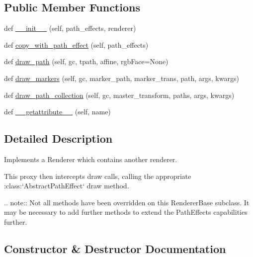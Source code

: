 \subsection*{Public Member Functions}
\begin{DoxyCompactItemize}
\item 
def \hyperlink{classmatplotlib_1_1patheffects_1_1PathEffectRenderer_ab66e2ac17ed5c48f7b41ad76886257ec}{\+\_\+\+\_\+init\+\_\+\+\_\+} (self, path\+\_\+effects, renderer)
\item 
def \hyperlink{classmatplotlib_1_1patheffects_1_1PathEffectRenderer_a7d03abb1e00bec7e2fd2e77923aa39fc}{copy\+\_\+with\+\_\+path\+\_\+effect} (self, path\+\_\+effects)
\item 
def \hyperlink{classmatplotlib_1_1patheffects_1_1PathEffectRenderer_a2f8787b0d39d373ebb2e303877ddfcd6}{draw\+\_\+path} (self, gc, tpath, affine, rgb\+Face=None)
\item 
def \hyperlink{classmatplotlib_1_1patheffects_1_1PathEffectRenderer_a959af761b5cd6ac3845bded4f68ab339}{draw\+\_\+markers} (self, gc, marker\+\_\+path, marker\+\_\+trans, path, args, kwargs)
\item 
def \hyperlink{classmatplotlib_1_1patheffects_1_1PathEffectRenderer_a5c7e5693aefa235c120791e25698cb65}{draw\+\_\+path\+\_\+collection} (self, gc, master\+\_\+transform, paths, args, kwargs)
\item 
def \hyperlink{classmatplotlib_1_1patheffects_1_1PathEffectRenderer_a99559fd9310d78cc7bfef8b4359ea8fc}{\+\_\+\+\_\+getattribute\+\_\+\+\_\+} (self, name)
\end{DoxyCompactItemize}


\subsection{Detailed Description}
\begin{DoxyVerb}Implements a Renderer which contains another renderer.

This proxy then intercepts draw calls, calling the appropriate
:class:`AbstractPathEffect` draw method.

.. note::
    Not all methods have been overridden on this RendererBase subclass.
    It may be necessary to add further methods to extend the PathEffects
    capabilities further.
\end{DoxyVerb}
 

\subsection{Constructor \& Destructor Documentation}
\mbox{\label{classmatplotlib_1_1patheffects_1_1PathEffectRenderer_ab66e2ac17ed5c48f7b41ad76886257ec}} 
